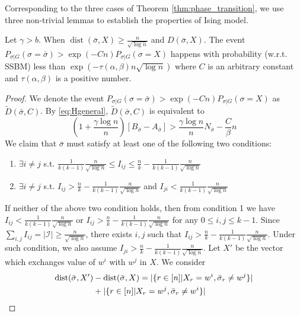 \documentclass[entropy,article,submit,moreauthors,pdftex]{Definitions/mdpi}
\newcommand{\cI}{\mathcal{I}}
\newcommand{\1}{\mathbbm{1}}
\DeclareMathOperator{\Dist}{dist}
\begin{document}
Corresponding to the three cases of Theorem \ref{thm:phase_transition}, we use three non-trivial lemmas to 
establish the properties of Ising model.
\begin{Lemma}\label{lem:sigmaX}
	Let $\gamma > b$. When $\Dist(\bar{\sigma}, X) \geq \frac{n}{\sqrt{\log n}}$ and $D(\bar{\sigma}, X)$. The event
	$P_{\sigma | G}(\sigma = \bar{\sigma} ) > \exp(-Cn) P_{\sigma | G}(\sigma = X)$
	happens with probability (w.r.t. SSBM) less than $\exp(-\tau(\alpha,\beta) n \sqrt{\log  n} )$
	where $C$ is an arbitrary constant and $\tau(\alpha,\beta)$ is a positive number.
\end{Lemma}
\begin{proof}
	We denote the event $P_{\sigma | G}(\sigma = \bar{\sigma} ) > \exp(-Cn) P_{\sigma | G}(\sigma = X)$ as $\widetilde{D}(\bar{\sigma}, C)$.
	By \eqref{eq:Hgeneral}, $\widetilde{D}(\bar{\sigma}, C)$
	is equivalent to
	\begin{equation}\label{eq:BwA}
	(1 + \frac{\gamma \log n}{n})[B_{\bar{\sigma}} - A_{\bar{\sigma}}] >  \frac{\gamma \log n}{n} N_{\bar{\sigma}}  - \frac{C}{\beta} n
	\end{equation}
	We claim that $\bar{\sigma}$ must satisfy at least one of the following two conditions:
	\begin{enumerate}
		\item $\exists i\neq j$ s.t. $\frac{1}{k(k-1)}\frac{n}{\sqrt{\log n}} \leq I_{ij} \leq \frac{n}{k} - \frac{1}{k(k-1)}\frac{n}{\sqrt{\log n}}$
		\item $\exists i \neq j$ s.t. $I_{ij} > \frac{n}{k} - \frac{1}{k(k-1)}\frac{n}{\sqrt{\log n}}$ and $I_{ji} < \frac{1}{k(k-1)}\frac{n}{\sqrt{\log n}}$
	\end{enumerate}
	If neither of the above two condition holds, then from condition 1 we have
	$I_{ij} < \frac{1}{k(k-1)}\frac{n}{\sqrt{\log n}}$ or $I_{ij} > \frac{n}{k} - \frac{1}{k(k-1)}\frac{n}{\sqrt{\log n}}$ for any $0 \leq i,j\leq k-1$.
	Since $\sum_{i,j} I_{ij} = |\cI| \geq \frac{n}{\sqrt{\log n}}$, there exists $i,j$ such that $I_{ij} > \frac{n}{k} - \frac{1}{k(k-1)}\frac{n}{\sqrt{\log n}}$.
	Under such condition, we also assume $I_{ji} > \frac{n}{k} - \frac{1}{k(k-1)}\frac{n}{\sqrt{\log n}}$.
	Let $X'$ be the vector which exchanges value of $w^i$ with $w^j$ in $X$. We consider
	\begin{align}
	 \Dist(\bar{\sigma}, X') & - \Dist(\bar{\sigma}, X)= |\{ r \in [n]|X_r=w^i, \bar{\sigma}_r \neq w^j \}| \notag\\
	&+ |\{ r \in [n]|X_r=w^j, \bar{\sigma}_r \neq w^i \}| \notag\\

\end{align}
\end{proof}
\end{document}
